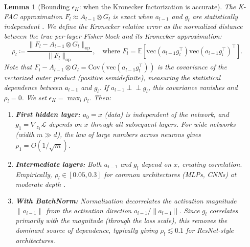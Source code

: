 \documentclass{article}
\providecommand{\E}{\mathbb{E}}
\providecommand{\norm}[1]{\lVert #1 \rVert}
\theoremstyle{plain}
\newtheorem{lemma}{Lemma}
\theoremstyle{definition}
\theoremstyle{remark}
\begin{document}
\begin{lemma}[Bounding $\epsilon_K$: when the Kronecker factorization is accurate]
\label{lem:epsilon_K}
The K-FAC approximation $F_l \approx A_{l-1} \otimes G_l$ is exact when $a_{l-1}$ and $g_l$ are statistically independent \citep{martens2015optimizing}. We define the \emph{Kronecker relative error} as the normalized distance between the true per-layer Fisher block and its Kronecker approximation:
\begin{equation}
\label{eq:rho_def}
    \rho_l \coloneqq \frac{\norm{F_l - A_{l-1} \otimes G_l}_{\mathrm{op}}}{\norm{F_l}_{\mathrm{op}}}, \quad \text{where } F_l = \E[\mathrm{vec}(a_{l-1}g_l^\top)\mathrm{vec}(a_{l-1}g_l^\top)^\top].
\end{equation}
Note that $F_l - A_{l-1} \otimes G_l = \mathrm{Cov}(\mathrm{vec}(a_{l-1}g_l^\top))$ is the \emph{covariance} of the vectorized outer product (positive semidefinite), measuring the statistical dependence between $a_{l-1}$ and $g_l$. If $a_{l-1} \perp\!\!\!\perp g_l$, this covariance vanishes and $\rho_l = 0$. We set $\epsilon_K = \max_l \rho_l$. Then:
\begin{enumerate}
    \item \textbf{First hidden layer:} $a_0 = x$ (data) is independent of the network, and $g_1 = \nabla_{z_1}\mathcal{L}$ depends on $x$ through all subsequent layers. For wide networks (width $m \gg d$), the law of large numbers across neurons gives $\rho_1 = O(1/\sqrt{m})$.
    \item \textbf{Intermediate layers:} Both $a_{l-1}$ and $g_l$ depend on $x$, creating correlation. Empirically, $\rho_l \in [0.05, 0.3]$ for common architectures (MLPs, CNNs) at moderate depth \citep{kunstner2019limitations}.
    \item \textbf{With BatchNorm:} Normalization decorrelates the activation \emph{magnitude} $\norm{a_{l-1}}$ from the activation \emph{direction} $a_{l-1}/\norm{a_{l-1}}$. Since $g_l$ correlates primarily with the magnitude (through the loss scale), this removes the dominant source of dependence, typically giving $\rho_l \lesssim 0.1$ for ResNet-style architectures.
\end{enumerate}
\end{lemma}
\end{document}
